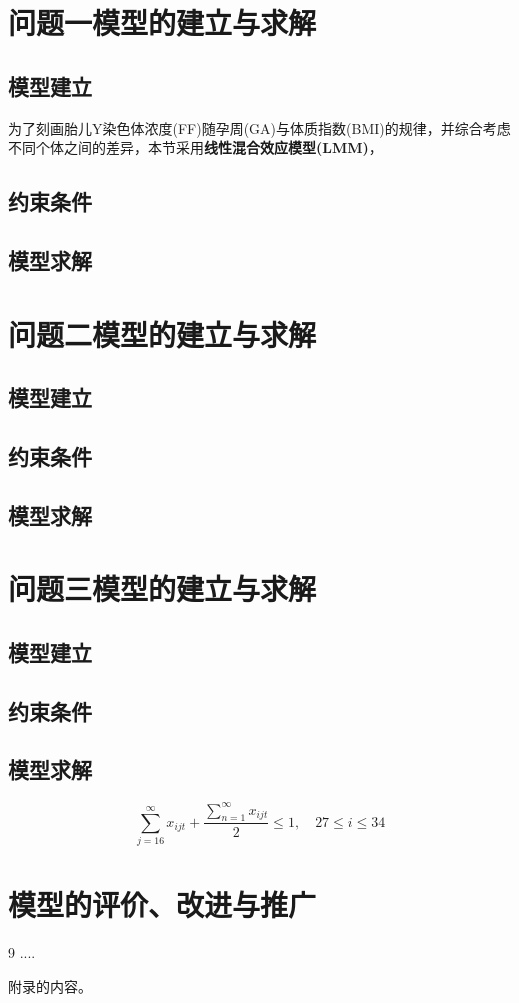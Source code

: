 \documentclass{cumcmthesis}
\begin{document}
        \section{问题一模型的建立与求解}
        \subsection{模型建立}
        为了刻画胎儿Y染色体浓度(FF)随孕周(GA)与体质指数(BMI)的规律，并综合考虑不同个体之间的差异，本节采用\textbf{线性混合效应模型(LMM)}，

        \subsection{约束条件}
        \subsection{模型求解}
        \section{问题二模型的建立与求解} 
        \subsection{模型建立}
        \subsection{约束条件} 
        \subsection{模型求解}
        \section{问题三模型的建立与求解} 
        \subsection{模型建立}
        \subsection{约束条件} 
        \subsection{模型求解}
        \begin{equation}\tag{8}
            \sum_{j=16}^{\infty} x_{ijt} + \frac{\sum_{n=1}^{\infty} x_{ijt}}{2} \leq 1,\quad 27\leq i\leq 34
        \end{equation}
        \section{模型的评价、改进与推广}

        \begin{thebibliography}{9}%
             ....
        \end{thebibliography}

        \begin{appendices}
            附录的内容。
        \end{appendices}
    
\end{document}
